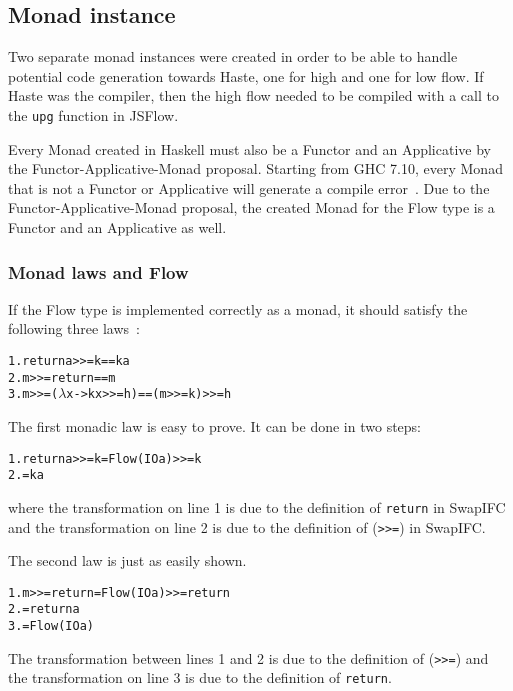 \subsection{Monad instance}
Two separate monad instances were created in order to be able to handle potential code generation towards Haste, one for high and one for low flow. If Haste was the compiler, then the high flow needed to be compiled with a call to the {\tt upg} function in JSFlow.

Every Monad created in Haskell must also be a Functor and an Applicative by the Functor-Applicative-Monad proposal. Starting from GHC 7.10, every Monad that is not a Functor or Applicative will generate a compile error~\cite{functor_applicative_monad}. Due to the Functor-Applicative-Monad proposal, the created Monad for the Flow type is a Functor and an Applicative as well.
\subsubsection{Monad laws and Flow}
\label{chapter:monad-laws}
If the Flow type is implemented correctly as a monad, it should satisfy the following three laws~\cite{functor-monad-law}:
\begin{alltt}
  1.  return a >>= k  ==  k a
  2.  m >>= return  ==  m
  3.  m >>= (\(\lambda\)x -> k x >>= h)  ==  (m >>= k) >>= h
\end{alltt}
The first monadic law is easy to prove. It can be done in two steps:
\begin{alltt}
  1. return a >>= k = Flow (IO a) >>= k
  2.                = k a
\end{alltt}
where the transformation on line 1 is due to the definition of {\tt return} in SwapIFC and the transformation on line 2 is due to the definition of ({\tt >>=}) in SwapIFC.

The second law is just as easily shown.
\begin{alltt}
  1. m >>= return = Flow (IO a) >>= return
  2.              = return a
  3.              = Flow (IO a)
\end{alltt}
The transformation between lines 1 and 2 is due to the definition of ({\tt >>=}) and the transformation on line 3 is due to the definition of {\tt return}.

